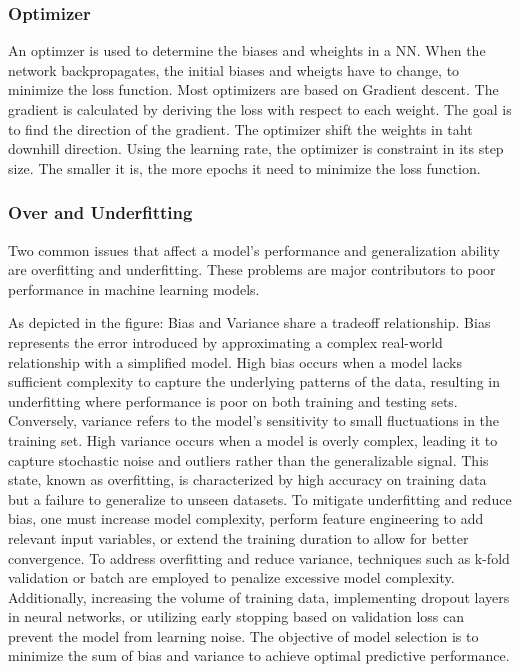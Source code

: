 \subsubsection*{Optimizer}
An optimzer is used to determine the biases and wheights in a NN. 
When the network backpropagates, the initial biases and wheigts have to change, to minimize the loss function. 
Most optimizers are based on Gradient descent.
The gradient is calculated by deriving the loss with respect to each weight.
The goal is to find the direction of the gradient.
The optimizer shift the weights in taht downhill direction.
Using the learning rate, the optimizer is constraint in its step size. 
The smaller it is, the more epochs it need to minimize the loss function.


\subsubsection*{Over and Underfitting}
Two common issues that affect a model's performance and generalization ability are overfitting and underfitting. 
These problems are major contributors to poor performance in machine learning models.




As depicted in the figure: Bias and Variance share a tradeoff relationship. 
Bias represents the error introduced by approximating a complex real-world relationship with a simplified model. 
High bias occurs when a model lacks sufficient complexity to capture the underlying patterns of the data, resulting in underfitting where performance is poor on both training and testing sets. 
Conversely, variance refers to the model's sensitivity to small fluctuations in the training set. 
High variance occurs when a model is overly complex, leading it to capture stochastic noise and outliers rather than the generalizable signal.
This state, known as overfitting, is characterized by high accuracy on training data but a failure to generalize to unseen datasets. 
To mitigate underfitting and reduce bias, one must increase model complexity, perform feature engineering to add relevant input variables, or extend the training duration to allow for better convergence. 
To address overfitting and reduce variance, techniques such as k-fold validation or batch are employed to penalize excessive model complexity. 
Additionally, increasing the volume of training data, implementing dropout layers in neural networks, or utilizing early stopping based on validation loss can prevent the model from learning noise. 
The objective of model selection is to minimize the sum of bias and variance to achieve optimal predictive performance.

